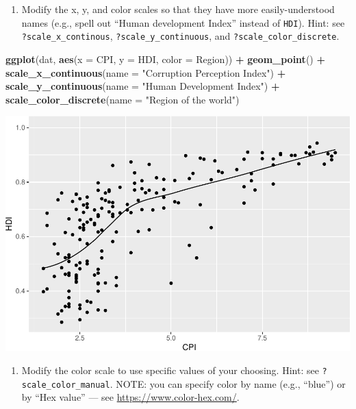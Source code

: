 \documentclass[
]{book}
\newenvironment{Shaded}{\begin{snugshade}}{\end{snugshade}}
\newcommand{\DataTypeTok}[1]{\textcolor[rgb]{0.13,0.29,0.53}{#1}}
\newcommand{\KeywordTok}[1]{\textcolor[rgb]{0.13,0.29,0.53}{\textbf{#1}}}
\newcommand{\NormalTok}[1]{#1}
\newcommand{\OperatorTok}[1]{\textcolor[rgb]{0.81,0.36,0.00}{\textbf{#1}}}
\newcommand{\StringTok}[1]{\textcolor[rgb]{0.31,0.60,0.02}{#1}}
\providecommand{\tightlist}{%
  \setlength{\itemsep}{0pt}\setlength{\parskip}{0pt}}
\begin{document}
\begin{enumerate}
\def\labelenumi{\arabic{enumi}.}
\setcounter{enumi}{1}
\tightlist
\item
  Modify the x, y, and color scales so that they have more easily-understood names (e.g., spell out ``Human development Index'' instead of \texttt{HDI}). Hint: see \texttt{?scale\_x\_continous}, \texttt{?scale\_y\_continuous}, and \texttt{?scale\_color\_discrete}.
\end{enumerate}

\begin{Shaded}
\begin{Highlighting}[]
\KeywordTok{ggplot}\NormalTok{(dat, }\KeywordTok{aes}\NormalTok{(}\DataTypeTok{x =}\NormalTok{ CPI, }\DataTypeTok{y =}\NormalTok{ HDI, }\DataTypeTok{color =}\NormalTok{ Region)) }\OperatorTok{+}
\StringTok{  }\KeywordTok{geom\_point}\NormalTok{() }\OperatorTok{+}
\StringTok{  }\KeywordTok{scale\_x\_continuous}\NormalTok{(}\DataTypeTok{name =} \StringTok{"Corruption Perception Index"}\NormalTok{) }\OperatorTok{+}
\StringTok{  }\KeywordTok{scale\_y\_continuous}\NormalTok{(}\DataTypeTok{name =} \StringTok{"Human Development Index"}\NormalTok{) }\OperatorTok{+}
\StringTok{  }\KeywordTok{scale\_color\_discrete}\NormalTok{(}\DataTypeTok{name =} \StringTok{"Region of the world"}\NormalTok{)}
\end{Highlighting}
\end{Shaded}

\includegraphics{R/Rgraphics/figures/unnamed-chunk-206-1.pdf}

\begin{enumerate}
\def\labelenumi{\arabic{enumi}.}
\setcounter{enumi}{2}
\tightlist
\item
  Modify the color scale to use specific values of your choosing. Hint: see \texttt{?scale\_color\_manual}. NOTE: you can specify color by name (e.g., ``blue'') or by ``Hex value'' --- see \url{https://www.color-hex.com/}.
\end{enumerate}
\end{document}
